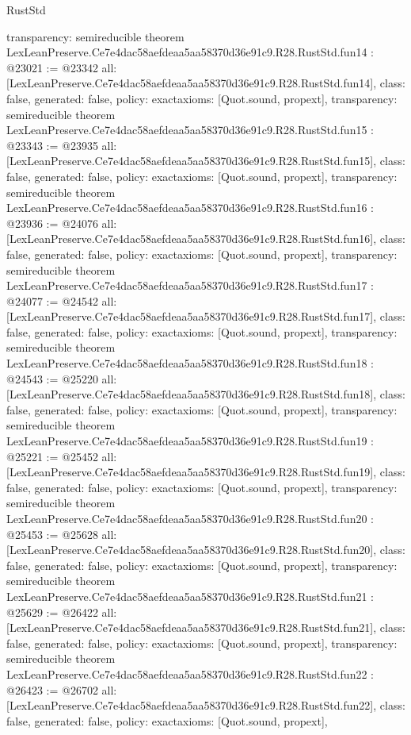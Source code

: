 \begin{lexlean}{RustStd}
\begin{coremodule}
{  transparency: semireducible
}
theorem LexLeanPreserve.Ce7e4dac58aefdeaa5aa58370d36e91c9.R28.RustStd.fun14 : @23021 := @23342 {
  all: [LexLeanPreserve.Ce7e4dac58aefdeaa5aa58370d36e91c9.R28.RustStd.fun14],
  class: false,
  generated: false,
  policy: exact{axioms: [Quot.sound, propext]},
  transparency: semireducible
}
theorem LexLeanPreserve.Ce7e4dac58aefdeaa5aa58370d36e91c9.R28.RustStd.fun15 : @23343 := @23935 {
  all: [LexLeanPreserve.Ce7e4dac58aefdeaa5aa58370d36e91c9.R28.RustStd.fun15],
  class: false,
  generated: false,
  policy: exact{axioms: [Quot.sound, propext]},
  transparency: semireducible
}
theorem LexLeanPreserve.Ce7e4dac58aefdeaa5aa58370d36e91c9.R28.RustStd.fun16 : @23936 := @24076 {
  all: [LexLeanPreserve.Ce7e4dac58aefdeaa5aa58370d36e91c9.R28.RustStd.fun16],
  class: false,
  generated: false,
  policy: exact{axioms: [Quot.sound, propext]},
  transparency: semireducible
}
theorem LexLeanPreserve.Ce7e4dac58aefdeaa5aa58370d36e91c9.R28.RustStd.fun17 : @24077 := @24542 {
  all: [LexLeanPreserve.Ce7e4dac58aefdeaa5aa58370d36e91c9.R28.RustStd.fun17],
  class: false,
  generated: false,
  policy: exact{axioms: [Quot.sound, propext]},
  transparency: semireducible
}
theorem LexLeanPreserve.Ce7e4dac58aefdeaa5aa58370d36e91c9.R28.RustStd.fun18 : @24543 := @25220 {
  all: [LexLeanPreserve.Ce7e4dac58aefdeaa5aa58370d36e91c9.R28.RustStd.fun18],
  class: false,
  generated: false,
  policy: exact{axioms: [Quot.sound, propext]},
  transparency: semireducible
}
theorem LexLeanPreserve.Ce7e4dac58aefdeaa5aa58370d36e91c9.R28.RustStd.fun19 : @25221 := @25452 {
  all: [LexLeanPreserve.Ce7e4dac58aefdeaa5aa58370d36e91c9.R28.RustStd.fun19],
  class: false,
  generated: false,
  policy: exact{axioms: [Quot.sound, propext]},
  transparency: semireducible
}
theorem LexLeanPreserve.Ce7e4dac58aefdeaa5aa58370d36e91c9.R28.RustStd.fun20 : @25453 := @25628 {
  all: [LexLeanPreserve.Ce7e4dac58aefdeaa5aa58370d36e91c9.R28.RustStd.fun20],
  class: false,
  generated: false,
  policy: exact{axioms: [Quot.sound, propext]},
  transparency: semireducible
}
theorem LexLeanPreserve.Ce7e4dac58aefdeaa5aa58370d36e91c9.R28.RustStd.fun21 : @25629 := @26422 {
  all: [LexLeanPreserve.Ce7e4dac58aefdeaa5aa58370d36e91c9.R28.RustStd.fun21],
  class: false,
  generated: false,
  policy: exact{axioms: [Quot.sound, propext]},
  transparency: semireducible
}
theorem LexLeanPreserve.Ce7e4dac58aefdeaa5aa58370d36e91c9.R28.RustStd.fun22 : @26423 := @26702 {
  all: [LexLeanPreserve.Ce7e4dac58aefdeaa5aa58370d36e91c9.R28.RustStd.fun22],
  class: false,
  generated: false,
  policy: exact{axioms: [Quot.sound, propext]},
}
\end{coremodule}
\end{lexlean}
